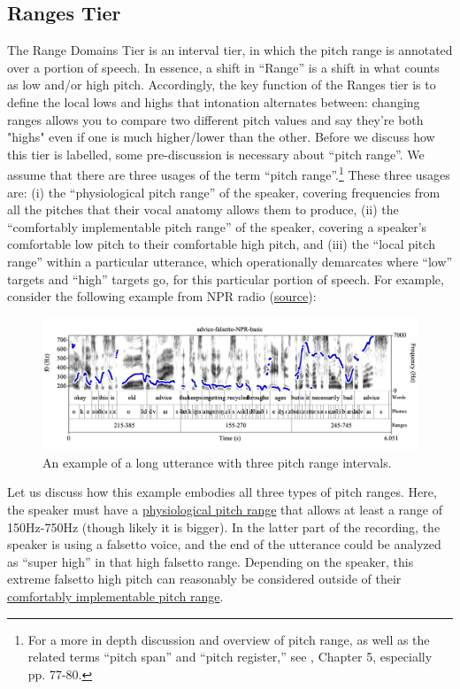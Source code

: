 \documentclass[11pt, twoside]{memoir}
\begin{document}
{{\subsection{Ranges Tier}\label{sec:ranges}
The Range Domains Tier is an interval tier, in which the pitch range is annotated over a portion of speech. In essence, a shift in “Range” is a shift in what counts as low and/or high pitch.
Accordingly, the key function of the Ranges tier is to define the local lows and highs that intonation alternates between: changing ranges allows you to compare two different pitch values and say they’re both "highs" even if one is much higher\slash lower than the other. Before we discuss how this tier is labelled, some pre-discussion is necessary about “pitch range”.
We assume that there are three usages of the term “pitch range”.\footnote{For a more in depth discussion and overview of pitch range, as well as the related terms “pitch span” and “pitch register,” see \citealt{gussenhoven04}, Chapter 5, especially pp. 77-80.} These three usages are: (i) the “physiological pitch range” of the speaker, covering frequencies from all the pitches that their vocal anatomy allows them to produce, (ii) the “comfortably implementable pitch range” of the speaker, covering a speaker’s comfortable low pitch to their comfortable high pitch, and (iii) the “local pitch range” within a particular utterance, which operationally demarcates where “low” targets and “high” targets go, for this particular portion of speech.
For example, consider the following example from NPR radio (\href{https://www.npr.org/sections/goatsandsoda/2018/05/11/603315432/the-best-mothers-day-gift-get-mom-out-of-the-box}{source}):
\begin{figure}[H]
\centering
\includegraphics[width=\linewidth]{Ranges-advice-falsetto-basic-all-3-ranges.png}
\caption{An example of a long utterance with three pitch range intervals.
\label{fig:advice-falsetto Ranges basic}
}
\end{figure}
Let us discuss how this example embodies all three types of pitch ranges. Here, the speaker must have a \uline{physiological pitch range} that allows at least a range of 150Hz-750Hz (though likely it is bigger). In the latter part of the recording, the speaker is using a falsetto voice, and the end of the utterance could be analyzed as “super high” in that high falsetto range. Depending on the speaker, this extreme falsetto high pitch can reasonably be considered outside of their \uline{comfortably implementable pitch range}.
}}
\end{document}
